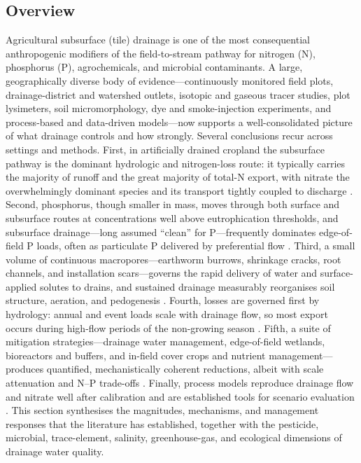 \subsection{Overview}

Agricultural subsurface (tile) drainage is one of the most consequential
anthropogenic modifiers of the field-to-stream pathway for nitrogen (N),
phosphorus (P), agrochemicals, and microbial contaminants. A large,
geographically diverse body of evidence---continuously monitored field
plots, drainage-district and watershed outlets, isotopic and gaseous
tracer studies, plot lysimeters, soil micromorphology, dye and
smoke-injection experiments, and process-based and data-driven
models---now supports a well-consolidated picture of what drainage
controls and how strongly. Several conclusions recur across settings and
methods. First, in artificially drained cropland the subsurface pathway is
the dominant hydrologic and nitrogen-loss route: it typically carries the
majority of runoff and the great majority of total-N export, with nitrate
the overwhelmingly dominant species and its transport tightly coupled to
discharge \parencite{Bechmann2014,Raymond2012,Williams2015,Grose2022}.
Second, phosphorus, though smaller in mass, moves through both surface and
subsurface routes at concentrations well above eutrophication thresholds,
and subsurface drainage---long assumed ``clean'' for P---frequently
dominates edge-of-field P loads, often as particulate P delivered by
preferential flow \parencite{Pease2018,VanEsbroeck2016,Uusitalo2001,Laubel1999}.
Third, a small volume of continuous macropores---earthworm burrows,
shrinkage cracks, root channels, and installation scars---governs the rapid
delivery of water and surface-applied solutes to drains, and sustained
drainage measurably reorganises soil structure, aeration, and pedogenesis
\parencite{Shipitalo2004,Villholth1998,Montagne2008}. Fourth, losses are
governed first by hydrology: annual and event loads scale with drainage
flow, so most export occurs during high-flow periods of the non-growing
season \parencite{Kladivko2021,Ikenberry2014,King2016}. Fifth, a suite of
mitigation strategies---drainage water management, edge-of-field wetlands,
bioreactors and buffers, and in-field cover crops and nutrient
management---produces quantified, mechanistically coherent reductions,
albeit with scale attenuation and N--P trade-offs
\parencite{Skaggs2010,Wu2025,Tanner2005,Jaynes2008,Hanrahan2018}. Finally,
process models reproduce drainage flow and nitrate well after calibration
and are established tools for scenario evaluation
\parencite{Youssef2018,Negm2014,Moriasi2013}. This section synthesises the
magnitudes, mechanisms, and management responses that the literature has
established, together with the pesticide, microbial, trace-element,
salinity, greenhouse-gas, and ecological dimensions of drainage water
quality.

